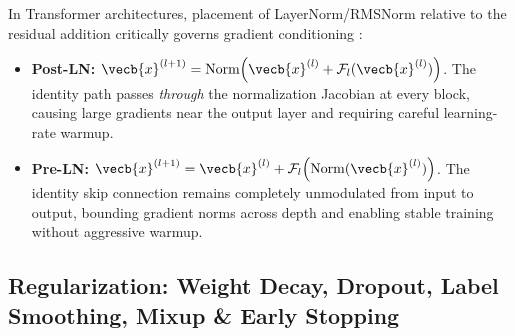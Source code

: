 \documentclass[../../../../master.tex]{subfiles}
\begin{document}
In Transformer architectures, placement of LayerNorm/RMSNorm relative to the residual addition critically governs gradient conditioning :
\begin{itemize}
  \item \textbf{Post-LN:} $\vecb{x}^{(l+1)} = \mathrm{Norm}\!\left(\vecb{x}^{(l)} + \mathcal{F}_l(\vecb{x}^{(l)})\right)$. The identity path passes \emph{through} the normalization Jacobian at every block, causing large gradients near the output layer and requiring careful learning-rate warmup.
  \item \textbf{Pre-LN:} $\vecb{x}^{(l+1)} = \vecb{x}^{(l)} + \mathcal{F}_l\!\left(\mathrm{Norm}(\vecb{x}^{(l)})\right)$. The identity skip connection remains completely unmodulated from input to output, bounding gradient norms across depth and enabling stable training without aggressive warmup.
\end{itemize}

\subsection{Regularization: Weight Decay, Dropout, Label Smoothing, Mixup \& Early Stopping}
\label{sec:normres:regularization}
\end{document}
